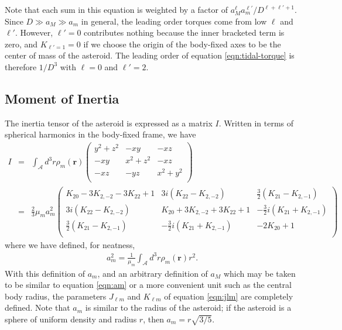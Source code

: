 \documentclass[linenumbers]{aastex631}
\newcommand{\parens}[1]{\left( #1 \right)}
\begin{document}
Note that each sum in this equation is weighted by a factor of $a_M^\ell a_m^{\ell'}/D^{\ell+\ell'+1}$. Since $D \gg a_M \gg a_m$ in general, the leading order torques come from low $\ell$ and $\ell'$. However, $\ell'=0$ contributes nothing because the inner bracketed term is zero, and $K_{\ell' = 1} = 0$ if we choose the origin of the body-fixed axes to be the center of mass of the asteroid. The leading order of equation \ref{eqn:tidal-torque} is therefore $1/D^3$ with $\ell = 0$ and $\ell' = 2$.


\subsection{Moment of Inertia}
The inertia tensor of the asteroid is expressed as a matrix $I$. Written in terms of spherical harmonics in the body-fixed frame, we have
\begin{eqnarray}
I & = &\int_\mathcal{A} d^3 r\rho_m(\mathbf r) \parens{\begin{array}{ccc}
y^2 + z^2 & -xy & -xz \\
-xy & x^2 + z^2 & -xz \\
-xz & -yz & x^2 + y^2 \\
\end{array}}\\
& = &\frac{2}{3}\mu_m a_m^2\parens{\begin{array}{ccc}
K_{20}-3K_{2,-2}-3K_{22}+1 & 3i \parens{K_{22}-K_{2,-2}} & \frac{3}{2}\parens{K_{21}-K_{2,-1}}\\
3i \parens{K_{22}-K_{2,-2}} & K_{20}+3K_{2,-2}+3K_{22}+1 & -\frac{3}{2}i\parens{K_{21}+K_{2,-1}}\\
\frac{3}{2}\parens{K_{21}-K_{2,-1}} & -\frac{3}{2}i\parens{K_{21}+K_{2,-1}} & -2K_{20}+1\\
\end{array}}
\label{eqn:moi}
\end{eqnarray}
where we have defined, for neatness,
\begin{eqnarray}
a_m^2=\frac{1}{\mu_m}\int_\mathcal{A} d^3 r \rho_m(\mathbf r) r^2.
\label{eqn:am}
\end{eqnarray}
With this definition of $a_m$, and an arbitrary definition of $a_M$ which may be taken to be similar to equation \ref{eqn:am} or a more convenient unit such as the central body radius, the parameters $J_{\ell m}$ and $K_{\ell m}$ of equation \ref{eqn:jlm} are completely defined. Note that $a_m$ is similar to the radius of the asteroid; if the asteroid is a sphere of uniform density and radius $r$, then $a_m = r\sqrt{3/5}$.
\end{document}
